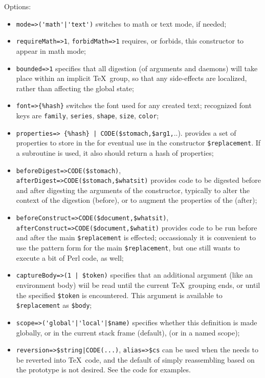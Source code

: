 \documentclass{book}
\newcommand{\ltxcode}{\lstinline[style=latexml]}
\begin{document}
Options:
\begin{itemize}
\item \ltxcode.mode=>('math'|'text'). switches to math or text mode, if needed;
\item \ltxcode|requireMath=>1|, \ltxcode|forbidMath=>1| requires, or forbids,
  this constructor to appear in math mode;
\item \ltxcode|bounded=>1| specifies that all digestion (of arguments and daemons)
  will take place within an implicit \TeX\ group, so that any side-effects
  are localized, rather than affecting the global state;
\item \ltxcode|font=>{%
  switches the font used for any created text;
  recognized font keys are \texttt{family}, \texttt{series}, \texttt{shape}, \texttt{size},
  \texttt{color};
\item \ltxcode.properties=> {%
  provides a set of properties to store in the  for eventual use
  in the constructor \ltxcode|$replacement|.  If a subroutine is used,
  it also should return a hash of properties;
\item \ltxcode|beforeDigest=>CODE($stomach)|,\\
      \ltxcode|afterDigest=>CODE($stomach,$whatsit)|
  provides code to be digested before and after digesting the arguments of
  the constructor, typically to alter the context of the digestion (before),
  or to augment the properties of the  (after);
\item  \ltxcode|beforeConstruct=>CODE($document,$whatsit)|,\\
      \ltxcode|afterConstruct=>CODE($document,$whatit)|
  provides code to be run before and after the main \ltxcode|$replacement|
  is effected; occassionaly it is convenient to use the pattern
  form for the main \ltxcode|$replacement|, but one still wants to execute
  a bit of Perl code, as well;
\item \ltxcode.captureBody=>(1 | $token).
  specifies that an additional argument (like an environment body) wiil
  be read until the current \TeX\ grouping ends, or until the specified \ltxcode|$token|
  is encountered. This argument is available to \ltxcode|$replacement| as \ltxcode|$body|;
\item \ltxcode.scope=>('global'|'local'|$name). specifies whether this
  definition is made globally, or in the current stack frame (default),
  (or in a named scope);
\item \ltxcode&reversion=>$string|CODE(...)&,
   \ltxcode|alias=>$cs|
  can be used when the  needs to be reverted into \TeX\ code,
  and the default of simply reassembling based on the prototype is not desired.
  See the code for examples.
\end{itemize}
\end{document}
